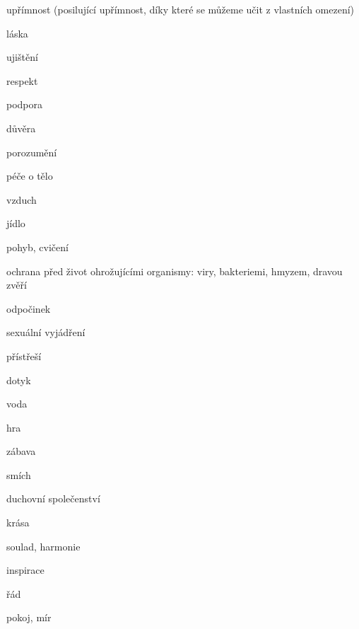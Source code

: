 {\begin{multicols}{2}
\begin{itemize*}
\begin{itemize*}
						\item upřímnost (posilující upřímnost, díky které se můžeme učit z vlastních omezení)
						\item láska
						\item ujištění
						\item respekt
						\item podpora
						\item důvěra
						\item porozumění
					\end{itemize*}
				\item péče o tělo
					\begin{itemize*}
						\item vzduch
						\item jídlo
						\item pohyb, cvičení
						\item ochrana před život ohrožujícími organismy: viry, bakteriemi, hmyzem, dravou zvěří
						\item odpočinek
						\item sexuální vyjádření
						\item přístřeší
						\item dotyk
						\item voda
					\end{itemize*}
				\item hra
					\begin{itemize*}
						\item zábava
						\item smích
					\end{itemize*}
				\item duchovní společenství
					\begin{itemize*}
						\item krása
						\item soulad, harmonie
						\item inspirace
						\item řád
						\item pokoj, mír
					\end{itemize*}
			\end{itemize*}
		\end{multicols}
}

